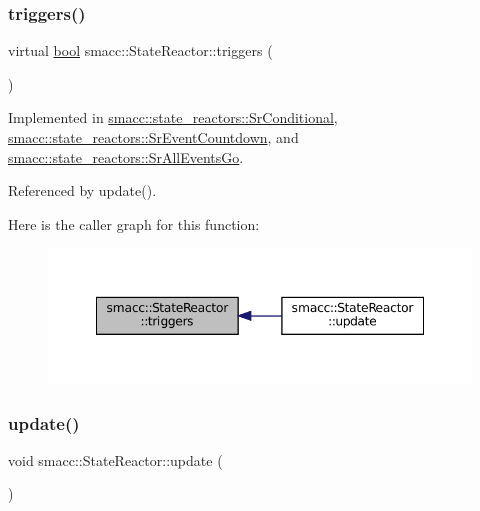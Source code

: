 \subsubsection{\texorpdfstring{triggers()}{triggers()}}
{\footnotesize\ttfamily virtual \hyperlink{classbool}{bool} smacc\+::\+State\+Reactor\+::triggers (\begin{DoxyParamCaption}{ }\end{DoxyParamCaption})\hspace{0.3cm}{\ttfamily [pure virtual]}}



Implemented in \hyperlink{classsmacc_1_1state__reactors_1_1SrConditional_acbd91c59644957faac4e9d7716513cb4}{smacc\+::state\+\_\+reactors\+::\+Sr\+Conditional}, \hyperlink{classsmacc_1_1state__reactors_1_1SrEventCountdown_aff678113dbd07339e5e3736e4aa00c81}{smacc\+::state\+\_\+reactors\+::\+Sr\+Event\+Countdown}, and \hyperlink{classsmacc_1_1state__reactors_1_1SrAllEventsGo_ab752043eda070661d2a676b580c679b7}{smacc\+::state\+\_\+reactors\+::\+Sr\+All\+Events\+Go}.



Referenced by update().

Here is the caller graph for this function\+:
\nopagebreak
\begin{figure}[H]
\begin{center}
\leavevmode
\includegraphics[width=348pt]{classsmacc_1_1StateReactor_a445bc3c90980d75d7d815b85cfb68b21_icgraph}
\end{center}
\end{figure}
\mbox{\label{classsmacc_1_1StateReactor_aca5d4f7af06532272db55943b7810a43}} 
\subsubsection{\texorpdfstring{update()}{update()}}
{\footnotesize\ttfamily void smacc\+::\+State\+Reactor\+::update (\begin{DoxyParamCaption}{ }\end{DoxyParamCaption})}



